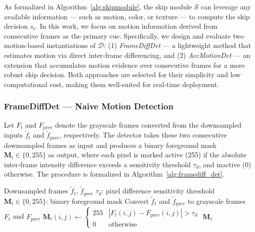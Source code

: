 \documentclass[final,3p,times,twocolumn]{elsarticle}
\begin{document}
As formalized in Algorithm~\ref{alg:skipmodule}, the skip module
$\mathcal{S}$ can leverage any available information --- such as
motion, color, or texture --- to compute the skip decision $s_t$. In
this work, we focus on motion information derived from consecutive
frames as the primary cue. Specifically, we design and evaluate two
motion-based instantiations of $\mathcal{D}$: (1) \textit{FrameDiffDet}
--- a lightweight method that estimates motion via direct inter-frame
differencing, and (2) \textit{AccMotionDet} --- an extension that
accumulates motion evidence over consecutive frames for a more robust
skip decision. Both approaches are selected for their simplicity and low
computational cost, making them well-suited for real-time deployment.

\subsubsection{FrameDiffDet --- Naive Motion Detection}\label{framediffdet-naive-motion-detection}

Let $F_t$ and $F_{\text{prev}}$ denote the grayscale frames converted
from the downsampled inputs $\tilde{f}_t$ and $\tilde{f}_{\text{prev}}$,
respectively. The detector takes these two consecutive downsampled
frames as input and produces a binary foreground mask
$\mathbf{M}_t \in \{0, 255\}$ as output, where each pixel is marked
active (255) if the absolute inter-frame intensity difference exceeds a
sensitivity threshold $\tau_d$, and inactive (0) otherwise. The
procedure is formalized in Algorithm~\ref{alg:framediff_det}.

\begin{algorithm}[t]
\caption{Frame Difference Detector (FrameDiffDet)}
\label{alg:framediff_det}
\begin{algorithmic}[1]
\Require Downsampled frames $\tilde{f}_t,\, \tilde{f}_{\text{prev}}$
\Param $\tau_d$: pixel difference sensitivity threshold
\Ensure $\mathbf{M}_t \in \{0, 255\}$: binary foreground mask
\Statex
\State Convert $\tilde{f}_t$ and $\tilde{f}_{\text{prev}}$ to grayscale frames $F_t$ and $F_{\text{prev}}$
\Statex
\State $\mathbf{M}_t(i,j) \leftarrow
\begin{cases}
255 & |F_t(i,j) - F_{\text{prev}}(i,j)| > \tau_d \\
0 & \text{otherwise}
\end{cases}$
\State \Return $\mathbf{M}_t$
\end{algorithmic}
\end{algorithm}
\end{document}
